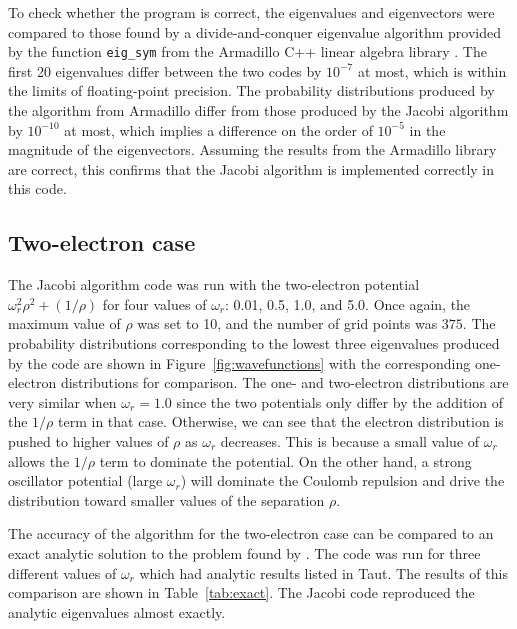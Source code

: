 \documentclass[aps,prc,reprint]{revtex4-1}
\begin{document}
        To check whether the program is correct, the eigenvalues and eigenvectors were compared to those found by a divide-and-conquer eigenvalue algorithm provided by the function \texttt{eig\_sym} from the Armadillo C++ linear algebra library \cite{Sanderson2010}. The first 20 eigenvalues differ between the two codes by $10^{-7}$ at most, which is within the limits of floating-point precision. The probability distributions produced by the algorithm from Armadillo differ from those produced by the Jacobi algorithm by $10^{-10}$ at most, which implies a difference on the order of $10^{-5}$ in the magnitude of the eigenvectors. Assuming the results from the Armadillo library are correct, this confirms that the Jacobi algorithm is implemented correctly in this code.

    \subsection{Two-electron case}
    \label{sub:twoelecresults}
        The Jacobi algorithm code was run with the two-electron potential $\omega_r^2 \rho^2 + (1/\rho)$ for four values of $\omega_r$: 0.01, 0.5, 1.0, and 5.0. Once again, the maximum value of $\rho$ was set to 10, and the number of grid points was $375$. The probability distributions corresponding to the lowest three eigenvalues produced by the code are shown in Figure~\ref{fig:wavefunctions} with the corresponding one-electron distributions for comparison. The one- and two-electron distributions are very similar when $\omega_r = 1.0$ since the two potentials only differ by the addition of the $1/\rho$ term in that case. Otherwise, we can see that the electron distribution is pushed to higher values of $\rho$ as $\omega_r$ decreases. This is because a small value of $\omega_r$ allows the $1/\rho$ term to dominate the potential. On the other hand, a strong oscillator potential (large $\omega_r$) will dominate the Coulomb repulsion and drive the distribution toward smaller values of the separation $\rho$.

        The accuracy of the algorithm for the two-electron case can be compared to an exact analytic solution to the problem found by \textcite{Taut1993}. The code was run for three different values of $\omega_r$ which had analytic results listed in Taut. The results of this comparison are shown in Table~\ref{tab:exact}. The Jacobi code reproduced the analytic eigenvalues almost exactly.
\end{document}
